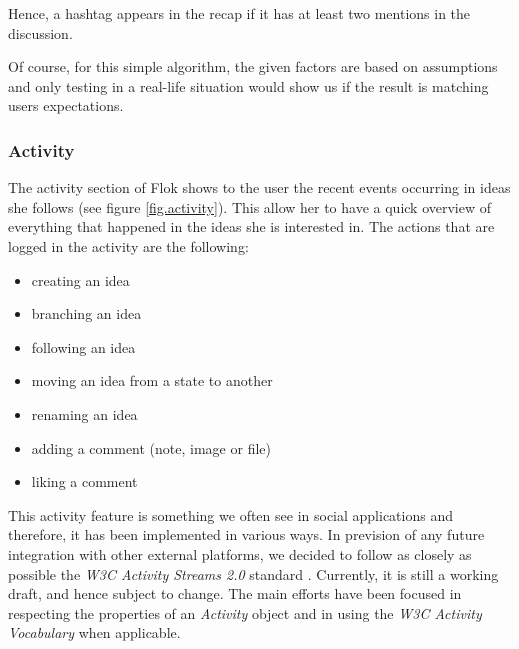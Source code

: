 \documentclass[a4paper,12pt,twoside]{article}
\begin{document}
Hence, a hashtag appears in the recap if it has at least two mentions in the discussion.

Of course, for this simple algorithm, the given factors are based on assumptions and only testing in a real-life situation would show us if the result is matching users expectations.

\subsubsection{Activity}
The activity section of Flok shows to the user the recent events occurring in ideas she follows (see figure \ref{fig.activity}).
This allow her to have a quick overview of everything that happened in the ideas she is interested in.
The actions that are logged in the activity are the following:
\begin{multicols}{2}
    \begin{itemize}
        \item creating an idea
        \item branching an idea
        \item following an idea
        \item moving an idea from a state to another
        \item renaming an idea
        \item adding a comment (note, image or file)
        \item liking a comment
    \end{itemize}
\end{multicols}

This activity feature is something we often see in social applications and therefore, it has been implemented in various ways.
In prevision of any future integration with other external platforms, we decided to follow as closely as possible the \emph{W3C Activity Streams 2.0} standard \cite{snell2015AS2}.
Currently, it is still a working draft, and hence subject to change.
The main efforts have been focused in respecting the properties of an \emph{Activity} object and in using the \emph{W3C Activity Vocabulary} \cite{snell2015AV} when applicable.

\end{document}
